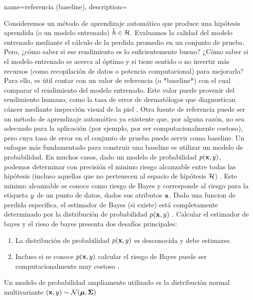 {name={referencia (baseline)},
    description={Consideremos un método de aprendizaje automático que produce una 
    hipótesis aprendida (o un modelo entrenado) $\hat{h} \in \mathcal{H}$.
	Evaluamos la calidad del modelo entrenado  
	mediante el cálculo de la perdida promedio en un conjunto de prueba. Pero, ¿cómo saber si ese rendimiento es lo suficientemente bueno?
	¿Cómo saber si el modelo entrenado se acerca al óptimo y si tiene sentido o no invertir más recursos (como recopilación de datos o potencia computacional) para mejorarlo? 
    Para ello, es útil contar con un valor de referencia (o *baseline*) con el cual comparar el rendimiento  
    del modelo entrenado. Este valor puede provenir del rendimiento humano,
    como la tasa de error de dermatólogos que diagnostican cáncer mediante inspección visual de la piel \cite{SkinHumanAI}.
	Otra fuente de referencia puede ser un método de aprendizaje automático ya existente que, por alguna razón, no sea adecuado para la aplicación (por ejemplo, por ser computacionalmente costoso), pero cuya tasa de error en el conjunto de prueba puede servir como baseline.
	Un enfoque más fundamentado para construir una baseline es utilizar un modelo de probabilidad. En muchos casos, dado un modelo de probabilidad $p({\bf x},y)$,  
    podemos determinar con precisión el minimo riesgo alcanzable entre todas las hipótesis (incluso aquellas que no pertenecen al espacio de hipótesis $\mathcal{H}$) \cite{LC}. 
    Este minimo alcanzable se conoce como riesgo de Bayes y corresponde al riesgo  para la etiqueta  $y$ de un punto de datos, dados sus atributos ${\bf x}$.
	Dado una funcion de perdida específica, el estimador de Bayes (si existe) está completamente determinado por la distribución de probabilidad $p({\bf x},y)$ \cite[Cap. 4]{LC}. 
    Calcular el estimador de bayes y el rieso de bayes presenta dos desafíos principales:
    \begin{enumerate}[label=\arabic*)]
    	\item La distribución de probabilidad $p({\bf x},y)$ es desconocida y debe estimarse.
    	\item Incluso si se conoce $p({\bf x},y)$ calcular el 
		riesgo de Bayes puede ser computacionalmente muy costoso \cite{cooper1990computational}.
	\end{enumerate}
	Un modelo de probabilidad ampliamente utilizado es la distribución normal multivariante $\left( {\bf x},y \right) \sim \mathcal{N}({\bm \mu},{\bm \Sigma})$ 
}}
